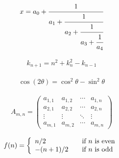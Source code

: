 \lipsum[2]

	\begin{equation}
		\begin{aligned}
			x = a_0 + \cfrac{1}{a_1
				+ \cfrac{1}{a_2
					+ \cfrac{1}{a_3 + \cfrac{1}{a_4} } } }
		\end{aligned}
	\end{equation}

\lipsum[3]

	\begin{equation}
		\begin{aligned}
			k_{n+1} = n^2 + k_n^2 - k_{n-1}
		\end{aligned}
	\end{equation}

\lipsum[4]

	\begin{equation}
		\begin{aligned}
			\cos (2\theta) = \cos^2 \theta - \sin^2 \theta
		\end{aligned}
	\end{equation}
	
\lipsum[5]

	\begin{equation}
		\begin{aligned}
			A_{m,n} =
			\begin{pmatrix}
			a_{1,1} & a_{1,2} & \cdots & a_{1,n} \\
			a_{2,1} & a_{2,2} & \cdots & a_{2,n} \\
			\vdots  & \vdots  & \ddots & \vdots  \\
			a_{m,1} & a_{m,2} & \cdots & a_{m,n}
			\end{pmatrix}
		\end{aligned}
	\end{equation}

\lipsum[6]

	\begin{equation}
		\begin{aligned}
			f(n) = \left\{ 
			\begin{array}{l l}
			n/2 & \quad \text{if $n$ is even}\\
			-(n+1)/2 & \quad \text{if $n$ is odd}
			\end{array} \right.
		\end{aligned}
	\end{equation}
	
\lipsum[7]